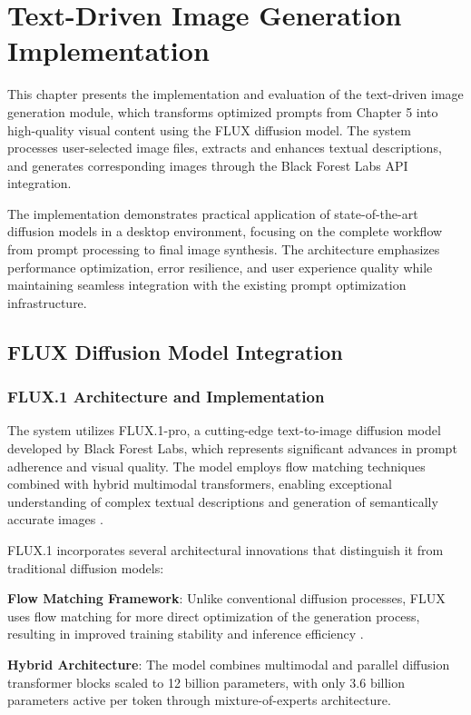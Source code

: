 \chapter{Text-Driven Image Generation Implementation}

This chapter presents the implementation and evaluation of the text-driven image generation module, which transforms optimized prompts from Chapter 5 into high-quality visual content using the FLUX diffusion model. The system processes user-selected image files, extracts and enhances textual descriptions, and generates corresponding images through the Black Forest Labs API integration.

The implementation demonstrates practical application of state-of-the-art diffusion models in a desktop environment, focusing on the complete workflow from prompt processing to final image synthesis. The architecture emphasizes performance optimization, error resilience, and user experience quality while maintaining seamless integration with the existing prompt optimization infrastructure.

\section{FLUX Diffusion Model Integration}

\subsection{FLUX.1 Architecture and Implementation}

The system utilizes FLUX.1-pro, a cutting-edge text-to-image diffusion model developed by Black Forest Labs, which represents significant advances in prompt adherence and visual quality. The model employs flow matching techniques combined with hybrid multimodal transformers, enabling exceptional understanding of complex textual descriptions and generation of semantically accurate images \cite{zhang2024flux, esser2024flux}.

FLUX.1 incorporates several architectural innovations that distinguish it from traditional diffusion models:

\textbf{Flow Matching Framework}: Unlike conventional diffusion processes, FLUX uses flow matching for more direct optimization of the generation process, resulting in improved training stability and inference efficiency \cite{liu2023flow}.

\textbf{Hybrid Architecture}: The model combines multimodal and parallel diffusion transformer blocks scaled to 12 billion parameters, with only 3.6 billion parameters active per token through mixture-of-experts architecture.

